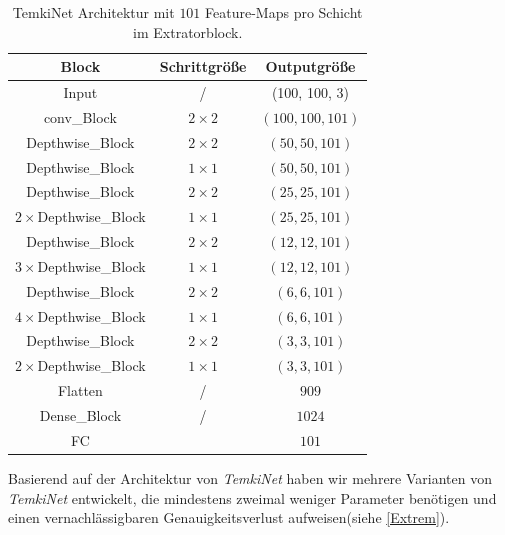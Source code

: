 \documentclass[12pt,a4paper]{scrartcl}
\numberwithin{equation}{section}
\begin{document}
\begin{table}[h!]
	\centering
	\begin{tabular}{|c|c|c|}
		\hline
		Block & Schrittgröße & Outputgröße\\ \hline
		Input & / & (100, 100, 3) \\ \hline
		conv\_Block &	$ 2\times2 $ &$ (100,100, 101) $\\ \hline
		Depthwise\_Block  & $ 2\times2 $&$ (50,50, 101) $\\ \hline
		Depthwise\_Block & $ 1\times1 $&$ (50,50, 101) $\\ \hline
		
		Depthwise\_Block  & $ 2\times2 $&$ (25,25, 101) $\\ \hline
		$ 2\times $Depthwise\_Block  & $ 1\times1 $&$ (25,25, 101) $\\ \hline
		
		Depthwise\_Block  & $ 2\times2 $&$ (12,12, 101) $\\ \hline
		$ 3\times $Depthwise\_Block  & $ 1\times1 $&$ (12,12, 101) $\\ \hline
		
		Depthwise\_Block  & $ 2\times2 $&$ (6,6, 101) $\\ \hline
		$ 4\times $Depthwise\_Block  & $ 1\times1 $&$ (6,6, 101) $\\ \hline
		
		Depthwise\_Block  & $ 2\times2 $&$ (3,3, 101) $\\ \hline
		$ 2\times $Depthwise\_Block & $ 1\times1 $&$ (3,3, 101) $\\ \hline
		Flatten & / &$ 909 $ \\ \hline
		Dense\_Block & / &$ 1024 $\\ \hline
		FC & & $ 101 $\\ \hline
		
	\end{tabular}
	\caption{TemkiNet Architektur mit $ 101 $ Feature-Maps pro Schicht im Extratorblock.  }
	\label{tab:Temki_Architectur}
\end{table}

Basierend auf der Architektur von \textit{TemkiNet} haben wir mehrere Varianten von \textit{TemkiNet} entwickelt, die mindestens zweimal weniger Parameter benötigen und einen vernachlässigbaren Genauigkeitsverlust aufweisen(siehe \ref{Extrem}).
\end{document}
